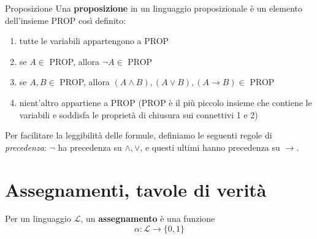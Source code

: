 \documentclass[a4paper,11pt]{report}
\begin{document}
\begin{defbox}{Proposizione}{}
    Una \textbf{proposizione} in un linguaggio proposizionale è un elemento dell'insieme PROP così definito:
    \begin{enumerate}
        \item tutte le variabili appartengono a PROP
        \item se \( A \in \) PROP, allora \( \neg A \in \) PROP
        \item se \( A, B \in \) PROP, allora \( (A \land B), (A \lor B), (A \to B) \in \) PROP
        \item nient'altro appartiene a PROP {\color{gray}(PROP è il più piccolo insieme che contiene le variabili e soddisfa le proprietà di chiusura sui connettivi 1 e 2)}
    \end{enumerate}
\end{defbox}

Per facilitare la leggibilità delle formule, definiamo le seguenti regole di \textit{precedenza}: \( \neg \) ha precedenza su \( \land, \lor \), e questi ultimi hanno precedenza su \( \to \).

\section{Assegnamenti, tavole di verità}

    Per un linguaggio \( \mathcal{L} \), un \textbf{assegnamento} è una funzione 
    \[
        \alpha : \mathcal{L} \to \{0, 1\}
    \]
\end{document}
